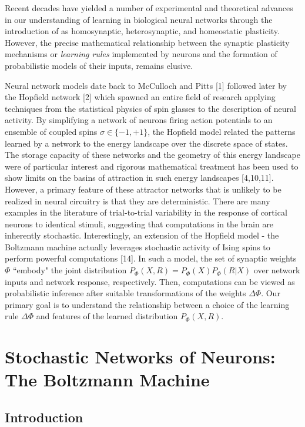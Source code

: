 \documentclass{ucetd}
\begin{document}
Recent decades have yielded a number of experimental and theoretical advances in our understanding of learning in biological neural networks through the introduction of as homosynaptic, heterosynaptic, and homeostatic plasticity. However, the precise mathematical relationship between the synaptic plasticity mechanisms or \emph{learning rules} implemented by neurons and the formation of probabilistic models of their inputs, remains elusive.

Neural network models date back to McCulloch and Pitts [1] followed later by the Hopfield network [2] which spawned an entire field of research applying techniques from the statistical physics of spin glasses to the description of neural activity. By simplifying a network of neurons firing action potentials to an ensemble of coupled spins $\sigma \in \{-1, +1\}$, the Hopfield model related the patterns learned by a network to the energy landscape over the discrete space of states. The storage capacity of these networks and the geometry of this energy landscape were of particular interest and rigorous mathematical treatment has been used to show limits on the basins of attraction in such energy landscapes [4,10,11]. However, a primary feature of these attractor networks that is unlikely to be realized in neural circuitry is that they are deterministic. There are many examples in the literature of trial-to-trial variability in the response of cortical neurons to identical stimuli, suggesting that computations in the brain are inherently stochastic. Interestingly, an extension of the Hopfield model - the Boltzmann machine actually leverages stochastic activity of Ising spins to perform powerful computations [14]. In such a model, the set of synaptic weights $\Phi$ ``embody" the joint distribution $P_{\Phi}(X,R) = P_{\Phi}(X)P_{\Phi}(R|X)$ over network inputs and network response, respectively. Then, computations can be viewed as probabilistic inference after suitable transformations of the weights $\Delta\Phi$. Our primary goal is to understand the relationship between a choice of the learning rule $\Delta \Phi$ and features of the learned distribution $P_{\Phi}(X,R)$.


\chapter{Stochastic Networks of Neurons: The Boltzmann Machine}
\section{Introduction}
\end{document}
